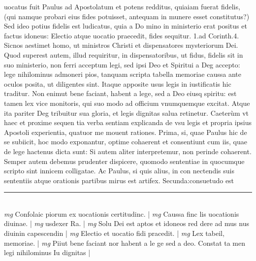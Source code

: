 \documentclass{article}
\begin{document}
\begin{pages}
uocatus fuit Paulus ad Apostolatum et potens redditus, quiaiam fuerat fidelis, (qui namque  probari eius fides potuisset, antequam in munere esset constitutus?) Sed ideo potius fidelis est ludicatus, quia a Do mino in ministerio erat positus et factus idoneus: Electio atque  uocatio praecedit, fides sequitur. 1.ad Corinth.4. Sicnos aestimet homo, ut ministros Christi et dispensatores mysteriorum Dei. Quod superest autem, illud requiritur, in dispensatoribus, ut fidus, fidelis sit in suo ministerio, non ferri acceptum legi, sed ipsi Deo et Spiritui a Deg accepto: lege nihilominus admoneri pios, tanquam scripta tabella memoriae caussa ante oculos posita, ut diligentes sint. Itaque  apposite usus legis in iustificatis hic traditur. Non enimut bene faciant, habent a lege, sed a Deo eiusq spiritu: est tamen lex vice monitoris, qui suo modo ad officium vnumquemque  excitat. Atque ita pariter Deg tribuitur sua gloria, et legis dignitas salua retinetur. Caeterùm vt haec et proxime sequen tia verba sentiam explicanda de vsu legis et propria ipsius Apostoli experientia, quatuor me mouent rationes. Prima, si, quae Paulus hic de se subiicit, hoc modo exponantur, optime cohaerent et consentiunt cum iis, quae de lege hactenus dicta sunt: Si autem aliter interpretemur, non perinde cohaerent. Semper autem debemus prudenter dispicere, quomodo sententiae in quocumque  scripto sint innicem colligatae. Ac Paulus, si quis alius, in con nectendis suis sententiis atque  orationis partibus mirus est artifex. Secunda:consuetudo est  \pend
\vspace{0.5cm}\noindent
\vspace{0.2cm}\rule{1cm}{0.2pt}\\ 
\hspace{0.2cm}\textit{mg}
\footnotesize Confolaic piorum ex uocationis certitudinc. 
\normalsize| 
\hspace{0.2cm}\textit{mg}
\footnotesize Caussa finc lis uocationis diuinae. 
\normalsize| 
\hspace{0.2cm}\textit{mg}
\footnotesize usdexer Ra. 
\normalsize| 
\hspace{0.2cm}\textit{mg}
\footnotesize Solu Dei est aptos et idoneos red dere ad mus nus diuinin capescendin 
\normalsize| 
\hspace{0.2cm}\textit{mg}
\footnotesize Electio et uocatio fidi pracedit. 
\normalsize| 
\hspace{0.2cm}\textit{mg}
\footnotesize Lex tabeil, memoriae. 
\normalsize| 
\hspace{0.2cm}\textit{mg}
\footnotesize Piiut bene faciant nor habent a le ge sed a deo. Constat ta men legi nihilominus Iu dignitas 
\normalsize| 

\end{pages}
\end{document}
